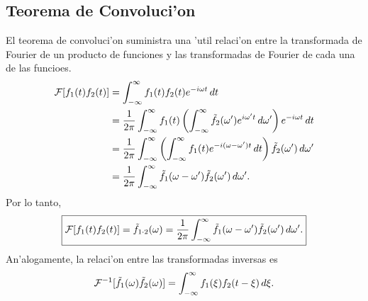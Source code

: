 \subsection{Teorema de Convoluci'on}
El teorema de convoluci'on suministra una 'util relaci'on entre la transformada de Fourier de un producto de funciones y las transformadas de Fourier de cada una de las funcioes.
\begin{align}
{\cal F}[f_1(t)f_2(t)]
 &=\int_{-\infty}^\infty f_1(t)f_2(t) e^{-i\omega t}\,dt \\
 &=\frac{1}{2\pi}\int_{-\infty}^\infty f_1(t) \left(\int_{-\infty}^\infty\tilde{f}_2(\omega')
 e^{i\omega' t}\,d\omega'\right)e^{-i\omega t}\,dt \\
 &=\frac{1}{2\pi}\int_{-\infty}^\infty\left(\int_{-\infty}^\infty f_1(t) 
 e^{-i(\omega-\omega')t}\,dt\right)\tilde{f}_2(\omega')\,d\omega' \\
 &=\frac{1}{2\pi} \int_{-\infty}^\infty\tilde{f}_1(\omega-\omega')\tilde{f}_2(\omega')\,d\omega'.
\end{align}
Por lo tanto, 
\begin{equation}\label{TeocovTF}
\boxed{{\cal F}[f_1(t)f_2(t)] = \tilde{f}_{1\cdot 2}(\omega)=\frac{1}{2\pi} \int_{-\infty}^\infty\tilde{f}_1(\omega-\omega')\tilde{f}_2(\omega')\,d\omega' .
 } 
\end{equation}   
An'alogamente, la relaci'on entre las transformadas inversas es
\begin{equation}
{\cal F}^{-1}[\tilde{f}_1(\omega)\tilde{f}_2(\omega)]
=\int_{-\infty}^\infty f_1(\xi)f_2(t-\xi)\,d\xi .	
\end{equation}



